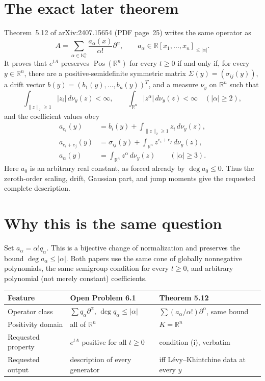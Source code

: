 \documentclass[11pt]{article}
\newcommand{\R}{\mathbb R}
\newcommand{\N}{\mathbb N}
\newcommand{\Pos}{\operatorname{Pos}}
\begin{document}
\section*{The exact later theorem}
Theorem~5.12 of arXiv:2407.15654 (PDF page~25) writes the same operator as
\[
 A=\sum_{\alpha\in\N_0^n}\frac{a_\alpha(x)}{\alpha!}\partial^\alpha,
 \qquad a_\alpha\in\R[x_1,\ldots,x_n]_{\le |\alpha|}.
\]
It proves that $e^{tA}$ preserves $\Pos(\R^n)$ for every $t\ge0$ if and
only if, for every $y\in\R^n$, there are a positive-semidefinite symmetric
matrix $\Sigma(y)=(\sigma_{ij}(y))$, a drift vector
$b(y)=(b_1(y),\ldots,b_n(y))^T$, and a measure $\nu_y$ on $\R^n$ such that
\[
 \int_{\|z\|_2\ge1}|z_i|\,d\nu_y(z)<\infty,
 \qquad
 \int_{\R^n}|z^\alpha|\,d\nu_y(z)<\infty\quad(|\alpha|\ge2),
\]
and the coefficient values obey
\begin{align*}
 a_{e_i}(y)
  &=b_i(y)+\int_{\|z\|_2\ge1}z_i\,d\nu_y(z),\\
 a_{e_i+e_j}(y)
  &=\sigma_{ij}(y)+\int_{\R^n}z^{e_i+e_j}\,d\nu_y(z),\\
 a_\alpha(y)
  &=\int_{\R^n}z^\alpha\,d\nu_y(z)\qquad(|\alpha|\ge3).
\end{align*}
Here $a_0$ is an arbitrary real constant, as forced already by
$\deg a_0\le0$.  Thus the zeroth-order scaling, drift, Gaussian part, and
jump moments give the requested complete description.

\section*{Why this is the same question}
Set $a_\alpha=\alpha!q_\alpha$.  This is a bijective change of
normalization and preserves the bound $\deg a_\alpha\le|\alpha|$.  Both
papers use the same cone of globally nonnegative polynomials, the same
semigroup condition for every $t\ge0$, and arbitrary polynomial (not merely
constant) coefficients.

\begin{center}
\small
\begin{tabularx}{\textwidth}{@{}p{}XX@{}}
\toprule
Feature & Open Problem 6.1 & Theorem 5.12 \\
\midrule
Operator class
 & $\sum q_\alpha\partial^\alpha$, $\deg q_\alpha\le|\alpha|$
 & $\sum(a_\alpha/\alpha!)\partial^\alpha$, same bound \\
Positivity domain
 & all of $\R^n$
 & $K=\R^n$ \\
Requested property
 & $e^{tA}$ positive for all $t\ge0$
 & condition (i), verbatim \\
Requested output
 & description of every generator
 & iff L\'evy--Khintchine data at every $y$ \\
\bottomrule
\end{tabularx}
\end{center}
\end{document}
